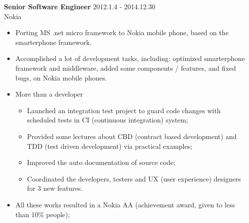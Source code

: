 \textbf{Senior Software Engineer} \hfill 2012.1.4 - 2014.12.30 \\
        Nokia
        \begin{itemize}  \itemsep -2pt %
                \item Porting MS .net micro framework to Nokia mobile phone, based on the smarterphone framework.
        \item Accomplished a lot of development tasks, including:
            optimized smarterphone framework and middleware, added some components / features, and fixed bugs,
        on Nokia mobile phones.
        \item More than a developer 
            \begin{itemize}  \itemsep -2pt
                \item Launched an integration test project to guard code changes
                with scheduled tests in CI (continuous integration) system;
                \item Provided some lectures about CBD (contract based development) and
                TDD (test driven development) via practical examples;
                \item Improved the auto documentation of source code;
                \item Coordinated the developers, testers and UX (user experience) designers for 3 new features.
            \end{itemize}
        \item All these works resulted in a Nokia AA (achievement award, given to less than 10\% people);
        \end{itemize}

